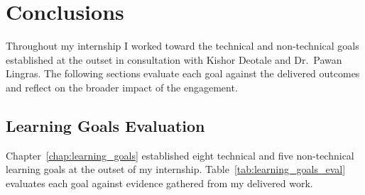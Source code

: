 
\chapter{Conclusions}
\label{chap:conclusions}

Throughout my internship I worked toward the technical and non-technical
goals established at the outset in consultation with Kishor Deotale and
Dr.\ Pawan Lingras. The following sections evaluate each goal against the
delivered outcomes and reflect on the broader impact of the engagement.

\section{Learning Goals Evaluation}
\label{sec:learning_goals_eval}

Chapter~\ref{chap:learning_goals} established eight technical and five non-technical
learning goals at the outset of my internship. Table~\ref{tab:learning_goals_eval}
evaluates each goal against evidence gathered from my delivered work.

